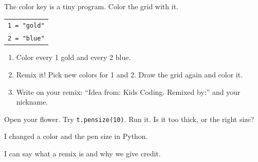 
\begin{playathome}
The color key is a tiny program. Color the grid with it.
\begin{center}
\begin{tabular}{@{}l@{}}
\texttt{1 = "gold"}\\
\texttt{2 = "blue"}
\end{tabular}
\qquad
\end{center}
\begin{enumerate}[leftmargin=1.4em,itemsep=2pt]
  \item Color every 1 gold and every 2 blue.
  \item Remix it! Pick new colors for 1 and 2. Draw the grid again and color it.
  \item Write on your remix: \enquote{Idea from: Kids Coding. Remixed by:} and your nickname.
\end{enumerate}
\end{playathome}

\begin{playathome}
Open your flower. Try \texttt{t.pensize(10)}. Run it. Is it too thick, or the right size?
\end{playathome}

\begin{selfcheck}
  \item I changed a color and the pen size in Python.
  \item I can say what a remix is and why we give credit.
\end{selfcheck}
